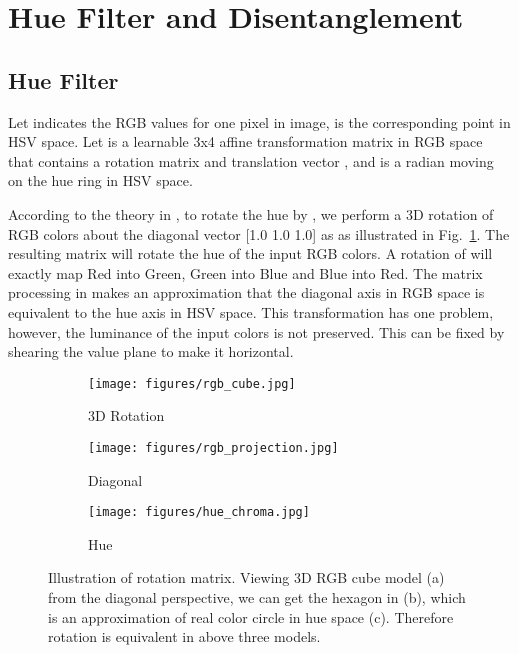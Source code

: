 \documentclass[runningheads]{llncs}
\begin{document}
   \section{Hue Filter and Disentanglement}
   \label{sec:hue-filter-disentangle}
  
   \subsection{Hue Filter}
   \label{color filter}
   Let  indicates the RGB values for one pixel in image,  is the corresponding point in HSV space. Let  is a learnable 3x4 affine transformation matrix in RGB space that contains a rotation matrix  and translation vector , and  is a radian moving on the hue ring in HSV space.
   
   According to the theory in \cite{haeberli1993matrix}, to rotate the hue by , we perform a 3D rotation of RGB colors about the diagonal vector [1.0 1.0 1.0] as as illustrated in Fig.~\ref{fig:rotation}.
   The resulting matrix will rotate the hue of the input RGB colors. A rotation of  will exactly map Red into Green, Green into Blue and Blue into Red.
   The matrix processing in \cite{haeberli1993matrix} makes an approximation that the diagonal axis in RGB space is equivalent to the hue axis in HSV space.
   This transformation has one problem, however, the luminance of the input colors is not preserved. 
   This can be fixed by shearing the value plane to make it horizontal.
   
   


   
   
   \begin{figure}[htbp]
   \centering
   
   \begin{subfigure}[t]{0.3\linewidth}
   \centering
   \texttt{[image: figures/rgb\_cube.jpg]}
   \caption{3D Rotation}
   \end{subfigure}
   \begin{subfigure}[t]{0.23\linewidth}
   \centering
   \texttt{[image: figures/rgb\_projection.jpg]}
   \caption{Diagonal}
   \end{subfigure}
   \begin{subfigure}[t]{0.25\linewidth}
   \centering
   \texttt{[image: figures/hue\_chroma.jpg]}
   \caption{Hue}
   \end{subfigure}
   
   \caption{Illustration of rotation matrix. Viewing 3D RGB cube model (a) from the diagonal perspective, we can get the hexagon in (b), which is an approximation of real color circle in hue space (c).
   Therefore rotation  is equivalent in above three models.
   }
   \label{fig:rotation}
   \end{figure}
   
\end{document}
